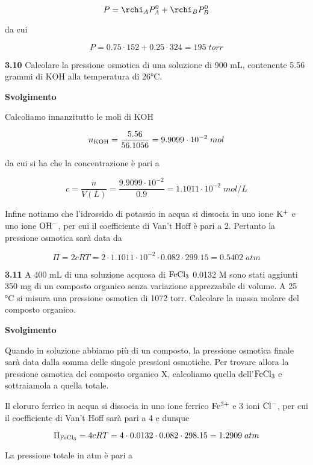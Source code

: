 $$P=\rchi_A P_A^0 + \rchi_B P_B^0$$

da cui 

$$P=0.75 \cdot 152 + 0.25 \cdot 324=195\;torr$$

\vspace{0.2cm}\textbf{3.10} Calcolare la pressione osmotica di una soluzione di 900 mL, contenente 5.56 grammi di KOH alla temperatura di 26°C.

\vspace{0.2cm}\large\textbf{Svolgimento}\normalsize

\vspace{0.2cm}Calcoliamo innanzitutto le moli di KOH

$$n_{\rm KOH}=\frac{5.56}{56.1056}=9.9099 \cdot 10^{-2}\;mol$$

da cui si ha che la concentrazione è pari a

$$c=\frac{n}{V(L)}=\frac{9.9099 \cdot 10^{-2}}{0.9}=1.1011 \cdot 10^{-2}\;mol/L$$

Infine notiamo che l'idrossido di potassio in acqua si dissocia in uno ione $\rm K^+$ e uno ione $\rm OH^-$, per cui il coefficiente di Van't Hoff è pari a 2. Pertanto la pressione osmotica sarà data da

$$\Pi=2cRT
=2 \cdot 1.1011 \cdot 10^{-2} \cdot 0.082 \cdot 299.15
=0.5402\;atm$$

\vspace{0.2cm}\textbf{3.11} A 400 mL di una soluzione acquosa di $\rm FeCl_3$ 0.0132 M sono stati aggiunti 350 mg di un composto organico senza variazione apprezzabile di volume. A 25 °C si misura una pressione osmotica di 1072 torr. Calcolare la massa molare del composto organico.

\vspace{0.2cm}\large\textbf{Svolgimento}\normalsize

\vspace{0.2cm}Quando in soluzione abbiamo più di un composto, la pressione osmotica finale sarà data dalla somma delle singole pressioni osmotiche. Per trovare allora la pressione osmotica del composto organico X, calcoliamo quella dell'$\rm FeCl_3$ e sottraiamola a quella totale.

Il cloruro ferrico in acqua si dissocia in uno ione ferrico $\rm Fe^{3+}$ e 3 ioni $\rm Cl^-$, per cui il coefficiente di Van't Hoff sarà pari a 4 e dunque

$$\Pi_{\rm FeCl_3}=4cRT
=4 \cdot 0.0132 \cdot 0.082 \cdot 298.15
=1.2909\;atm$$

La pressione totale in atm è pari a


